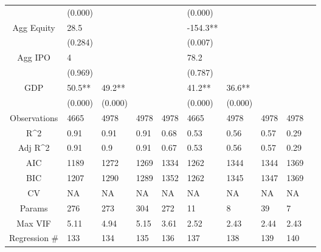 \documentclass{article}
\begin{document}
\begin{table}[H]
\begin{tabular}{|clllllllll|}
   & (0.000) &  &  &  & (0.000) &  &  &  & \\ 
  Agg Equity & 28.5 &  &  &  & -154.3** &  &  &  & \\ 
   & (0.284) &  &  &  & (0.007) &  &  &  & \\ 
  Agg IPO & 4 &  &  &  & 78.2 &  &  &  & \\ 
   & (0.969) &  &  &  & (0.787) &  &  &  & \\ 
  GDP & 50.5** & 49.2** &  &  & 41.2** & 36.6** &  &  & \\ 
   & (0.000) & (0.000) &  &  & (0.000) & (0.000) &  &  & \\ 
  \hline 
 Observations & 4665 & 4978 & 4978 & 4978 & 4665 & 4978 & 4978 & 4978 & \\ 
  R^2 & 0.91 & 0.91 & 0.91 & 0.68 & 0.53 & 0.56 & 0.57 & 0.29 & \\ 
  Adj R^2 & 0.91 & 0.9 & 0.91 & 0.67 & 0.53 & 0.56 & 0.57 & 0.29 & \\ 
  AIC & 1189 & 1272 & 1269 & 1334 & 1262 & 1344 & 1344 & 1369 & \\ 
  BIC & 1207 & 1290 & 1289 & 1352 & 1262 & 1345 & 1347 & 1369 & \\ 
  CV & NA & NA & NA & NA & NA & NA & NA & NA & \\ 
  Params & 276 & 273 & 304 & 272 & 11 & 8 & 39 & 7 & \\ 
  Max VIF & 5.11 & 4.94 & 5.15 & 3.61 & 2.52 & 2.43 & 2.44 & 2.43 & \\ 
  Regression \# & 133 & 134 & 135 & 136 & 137 & 138 & 139 & 140 & \\ 
   \hline
\end{tabular}
 
\end{table}
\end{document}
